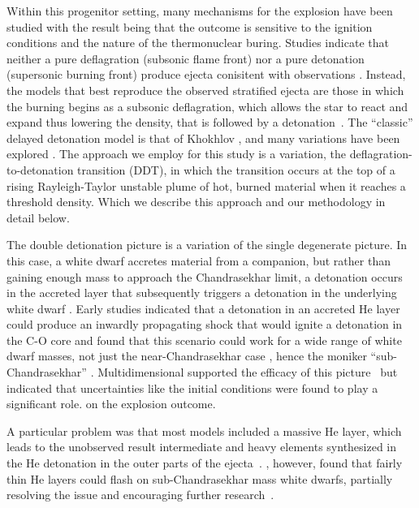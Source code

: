 \documentclass[iop,apj]{emulateapj}
\begin{document}
Within this progenitor setting, many mechanisms for the explosion have 
been studied with the result being that the outcome is sensitive to
the ignition conditions and the nature of the thermonuclear buring.
Studies indicate that neither a pure deflagration (subsonic flame front)
nor a pure detonation (supersonic burning front) produce ejecta conisitent
with observations \citep{arnett69,roepkeetal07}.
Instead, the models that best reproduce the observed
stratified ejecta are those in which the burning begins as a 
subsonic deflagration, which allows the star to react and expand
thus lowering the density, that is followed by a 
detonation~\citep{Nomo84,Khokhlov1991Delayed-detonat,HoefKhok96,GameKhokOran05}.
The ``classic'' delayed detonation model is that of 
Khokhlov \cite{Khokhlov1991Delayed-detonat,hoflich.khokhlov.ea:delayed,GameKhokOran05},
and many variations have been 
explored \cite[and references therein]{hillebrandtetal2013,calderetal2013}.
The approach we employ for this study is a variation, the 
deflagration-to-detonation transition (DDT), in which the transition
occurs at the top of a rising Rayleigh-Taylor unstable plume of hot, burned 
material when it reaches a threshold density.
Which we describe this approach and our methodology  in detail below.

The double detionation picture is a variation of the single degenerate picture.
In this case, a white dwarf accretes material from a companion, but rather
than gaining enough mass to approach the Chandrasekhar limit, a detonation
occurs in the accreted layer that subsequently triggers a detonation
in the underlying white dwarf \citet{woosleyweavertaam80,taam80a,taam80b,
nomoto80,nomoto82b}. Early studies indicated that a detonation in an 
accreted He
layer could produce an inwardly propagating
shock that would ignite a detonation in the C-O core and found
that this scenario could work for a wide range of white dwarf
masses, not just the near-Chandrasekhar case \citep{livne90}, hence the
moniker ``sub-Chandrasekhar'' \citep{ww94}. Multidimensional supported the
efficacy of this picture~\citep{livneglasner91, livnearnett95,HoefKhok96,
hoeflichetal96, wigginsfalle97,wigginsetal98,garciasenzbravowoosley99} 
but indicated that uncertainties 
like the initial conditions were found to play a significant role.
on the explosion outcome. 

A particular problem was that most models 
included a massive He layer, which leads to 
the unobserved result intermediate and heavy elements synthesized in 
the He detonation in the outer parts of the ejecta~\citep{HoefKhok96, 
hoeflichetal96,finkhillebrandtroepke2007,simetal2010}.
\citet{bildstenetal2007}, however, found that fairly thin He layers
could flash on sub-Chandrasekhar
mass white dwarfs, partially resolving the issue and encouraging
further research~\citep{simetal2012,brooksetal2015, shenetal2018,
glasneretal2018}.
\end{document}
